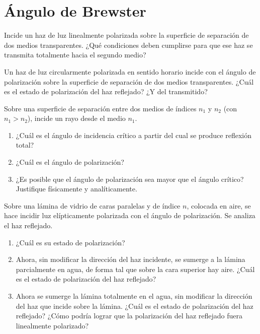 \section*{Ángulo de Brewster}

\item Incide un haz de luz linealmente polarizada sobre la superficie de separación de dos medios transparentes.
¿Qué condiciones deben cumplirse para que ese haz se transmita totalmente hacia el segundo medio?



\item Un haz de luz circularmente polarizada en sentido horario incide con el ángulo de polarización sobre la superficie de separación de dos medios transparentes.
¿Cuál es el estado de polarización del haz reflejado?
¿Y del transmitido?



\item Sobre una superficie de separación entre dos medios de índices $n_1$ y $n_2$ (con $n_1 > n_2$), incide un rayo desde el medio $n_1$.
\begin{enumerate}
	\item ¿Cuál es el ángulo de incidencia crítico a partir del cual se produce reflexión total? 
	\item ¿Cuál es el ángulo de polarización? 
	\item ¿Es posible que el ángulo de polarización sea mayor que el ángulo crítico?
	Justifique físicamente y analíticamente.
\end{enumerate}



\item Sobre una lámina de vidrio de caras paralelas y de índice $n$, colocada en aire, se hace incidir luz elípticamente polarizada con el ángulo de polarización.
Se analiza el haz reflejado.
\begin{enumerate}
	\item ¿Cuál es su estado de polarización?
	\item Ahora, sin modificar la dirección del haz incidente, se sumerge a la lámina parcialmente en agua, de forma tal que sobre la cara superior hay aire.
	¿Cuál es el estado de polarización del haz reflejado?
	\item Ahora se sumerge la lámina totalmente en el agua, sin modificar la dirección del haz que incide sobre la lámina.
	¿Cuál es el estado de polarización del haz reflejado?
	¿Cómo podría lograr que la polarización del haz reflejado fuera linealmente polarizado?
\end{enumerate}



